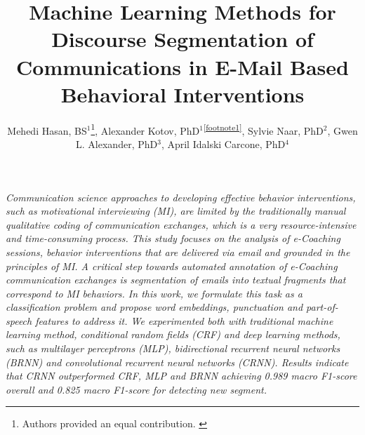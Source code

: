 \documentclass{amia}
\begin{document}
\title{Machine Learning Methods for Discourse Segmentation of Communications in E-Mail Based Behavioral Interventions}

\author{Mehedi Hasan, BS$^{1}$\footnote{Authors provided an equal contribution. \label{footnote1}}, Alexander Kotov, PhD$^{1}$\textsuperscript{\ref{footnote1}}, Sylvie Naar, PhD$^{2}$, Gwen L. Alexander, PhD$^{3}$, April Idalski Carcone, PhD$^{4}$}


\maketitle

\textit{Communication science approaches to developing effective behavior interventions, such as motivational interviewing (MI), are limited by the traditionally manual qualitative coding of communication exchanges, which is a very resource-intensive and time-consuming process. This study focuses on the analysis of e-Coaching sessions, behavior interventions that are delivered via email and grounded in the principles of MI. A critical step towards automated annotation of e-Coaching communication exchanges is segmentation of emails into textual fragments that correspond to MI behaviors. In this work, we formulate this task as a classification problem and propose word embeddings, punctuation and part-of-speech features to address it. We experimented both with traditional machine learning method, conditional random fields (CRF) and deep learning methods, such as multilayer perceptrons (MLP), bidirectional recurrent neural networks (BRNN) and convolutional recurrent neural networks (CRNN). Results indicate that CRNN outperformed CRF, MLP and BRNN achieving 0.989 macro F1-score overall and 0.825 macro F1-score for detecting new segment.}
\end{document}
